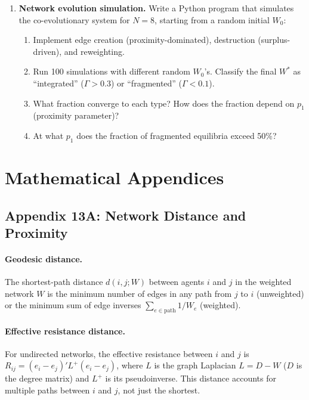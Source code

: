 \documentclass[../structural_economics_book.tex]{subfiles}
\begin{document}
\begin{enumerate}[label=\textbf{13.\arabic*}, leftmargin=3em]
\item \textbf{Network evolution simulation.} Write a Python program that simulates the co-evolutionary system for $N = 8$, starting from a random initial $W_0$:
\begin{enumerate}
\item Implement edge creation (proximity-dominated), destruction (surplus-driven), and reweighting.
\item Run 100 simulations with different random $W_0$'s. Classify the final $W^*$ as ``integrated'' ($\Gamma > 0.3$) or ``fragmented'' ($\Gamma < 0.1$).
\item What fraction converge to each type? How does the fraction depend on $p_1$ (proximity parameter)?
\item At what $p_1$ does the fraction of fragmented equilibria exceed 50\%?
\end{enumerate}
\end{enumerate}


\newpage
\section*{Mathematical Appendices}


\subsection*{Appendix 13A: Network Distance and Proximity}
\label{ch13:app:distance}

\paragraph{Geodesic distance.} The shortest-path distance $d(i, j; W)$ between agents $i$ and $j$ in the weighted network $W$ is the minimum number of edges in any path from $j$ to $i$ (unweighted) or the minimum sum of edge inverses $\sum_{e \in \text{path}} 1/W_e$ (weighted).

\paragraph{Effective resistance distance.} For undirected networks, the effective resistance between $i$ and $j$ is $R_{ij} = (e_i - e_j)'L^+(e_i - e_j)$, where $L$ is the graph Laplacian $L = D - W$ ($D$ is the degree matrix) and $L^+$ is its pseudoinverse. This distance accounts for multiple paths between $i$ and $j$, not just the shortest.
\end{document}
